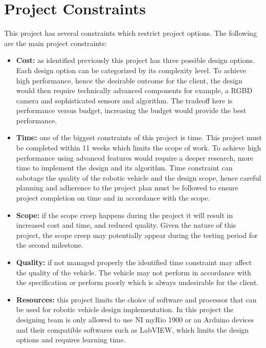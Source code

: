 \documentclass[a4paper]{article}
\begin{document}
\section{Project Constraints}
This project has several constraints which restrict project options. The following are the main project constraints:
\begin{itemize}
\item \textbf{Cost:} as identified previously this project has three possible design options. Each design option can be categorized by its complexity level. To achieve high performance, hence the desirable outcome for the client, the design would then require technically advanced components for example, a RGBD camera and  sophisticated sensors and algorithm. The tradeoff here is performance versus budget, increasing the budget would provide the best performance.
\item \textbf{Time:} one of the biggest constraints of this project is time. This project must be completed within 11 weeks which limits the scope of work. To achieve high performance using advanced features would require a deeper research, more time to implement the design and its algorithm. Time constraint can sabotage the quality of the robotic vehicle and the design scope, hence careful planning and adherence to the project plan must be followed to ensure project completion on time and in accordance with the scope. 
\item \textbf{Scope:} if the scope creep happens during the project it will result in increased cost and time, and reduced quality. Given the nature of this project, the scope creep may potentially appear during the testing period for the second milestone. 
\item \textbf{Quality:} if not managed properly the identified time constraint may affect the quality of the vehicle. The vehicle may not perform in accordance with the specification or perform poorly which is always undesirable for the client.
\item \textbf{Resources:} this project limits the choice of software and processor that can be used for robotic vehicle design implementation. In this project the designing team is only allowed to use NI myRio 1900 or an Arduino devices and their compatible softwares such as LabVIEW, which limits the design options and requires learning time.
\end{itemize}

\end{document}
